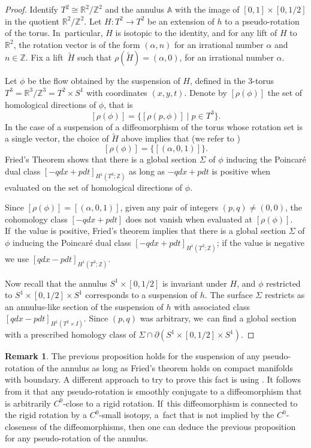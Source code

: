 \documentclass[JEP,XML,SOM,Unicode,NoEqCountersInSection,NoFloatCountersInSection,published]{cedram}
\theoremstyle{definition}
\newtheorem{Remark}[theorem]{Remark}
\begin{document}
\begin{proof}
Identify $T^2\cong \mathbb{R}^2/\mathbb{Z}^2$ and the annulus $\mathbb{A}$ with the image of $[0,1]\times [0,1/2]$ in the quotient $\mathbb{R}^2/\mathbb{Z}^2$. Let $H: T^2 \to T^2$
be an extension of $h$ to a pseudo-rotation of the torus. In~particular, $H$ is isotopic to the identity, and for any lift of $H$ to $\mathbb{R}^2$, the rotation vector is of the form $(\alpha,n)$ for an irrational number $\alpha$ and $n\in \mathbb{Z}$. Fix a lift~$\widetilde H$ such that $\rho(\widetilde H)=(\alpha,0)$, for an irrational number $\alpha$.

Let $\phi$ be the flow obtained by the suspension of $H$, defined in the 3-torus $T^3=\mathbb{R}^3/\mathbb{Z}^3=T^2\times S^1$ with coordinates $(x,y,t)$.
Denote by $[\rho(\phi)]$ the set of homological directions of $\phi$, that is
\[
[\rho(\phi)]=\{ [\rho(p,\phi)]\mid p\in T^3\}.
\]
In the case of a suspension of a diffeomorphism of the torus whose rotation set is a single vector, the choice of $\widetilde H$ above implies that (we refer to \cite[Eq.\,2.2]{K1})
\[
[\rho(\phi)]=\{[(\alpha,0,1)]\}.
\]
Fried's Theorem \cite[Th.\,D]{Fr} shows that there is a global section $\Sigma$ of $\phi$ inducing the Poincaré dual class $[-qdx+pdt]_{H^1(T^3;\mathbb{Z})}$ as long as $-qdx+pdt$ is positive when evaluated on the set of homological directions of $\phi$.

{Since $[\rho(\phi)]=[(\alpha,0,1)]$}, given any pair of integers $(p,q)\neq (0,0)$, the cohomology class $[-qdx+pdt]$ does not vanish when evaluated at $[\rho(\phi)]$. If~the value is positive, Fried's theorem implies that there is a global section $\Sigma$ of $\phi$ inducing the Poincaré dual class $[-qdx+pdt]_{H^1({T}^3;\mathbb{Z})}$; if the value is negative we use $[qdx-pdt]_{H^1(T^3;\mathbb{Z})}$.

Now recall that the annulus $S^1\times [0,1/2]$ is invariant under $H$, and $\phi$ restricted to $S^1\times[0,1/2]\times S^1$ corresponds to a suspension of $h$. The surface $\Sigma$ restricts as an annulus-like section of the suspension of $h$ with associated class $[qdx-pdt]_{H^1(T^2\times I)}$. Since $(p,q)$ was arbitrary, we~can find a global section with a prescribed homology class of $\Sigma\cap \partial (S^1\times [0,1/2] \times S^1)$.
\end{proof}

\begin{Remark}
The previous proposition holds for the suspension of any pseudo-rotation of the annulus as long as Fried's theorem holds on compact manifolds with boundary. A different approach to try to prove this fact is using \cite[Prop.\,5.1]{BCLP}. It follows from it that any pseudo-rotation is smoothly conjugate to a diffeomorphism that is arbitrarily $C^0$-close to a rigid rotation. If~this diffeomorphism is connected to the rigid rotation by a $C^0$-small isotopy, a~fact that is not implied by the $C^0$-closeness of the diffeomorphisms, then one can deduce the previous proposition for any pseudo-rotation of the annulus.
\end{Remark}
\end{document}
